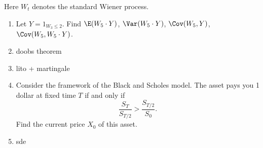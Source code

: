 Here $W_t$ denotes the standard Wiener process.

\begin{enumerate}


\item Let $Y = 1_{W_3 \leq 2}$. Find $\E(W_5 \cdot Y)$, $\Var(W_5 \cdot Y)$, $\Cov(W_5, Y)$, $\Cov(W_5, W_5 \cdot Y)$.

\item doobs theorem

\item lito + martingale

\item Consider the framework of the Black and Scholes model. The asset pays you 1 dollar at fixed time $T$ if and only if
\[
\frac{S_T}{S_{T/2}} > \frac{S_{T/2}}{S_0}.
\]
Find the current price $X_0$ of this asset.


\item sde




\end{enumerate}
